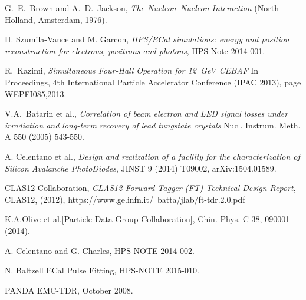 \documentclass[12pt]{report}
\begin{document}
\begin{thebibliography}{99}

  

  G.~E.~Brown and A.~D.~Jackson, {\it The
Nucleon--Nucleon Interaction} (North--Holland, Amsterdam, 1976).

 H. Szumila-Vance and M. Garcon, {\it HPS/ECal simulations: energy and
position reconstruction for electrons, positrons and photons}, HPS-Note 2014-001.

 R.~Kazimi, {\it Simultaneous Four-Hall Operation for 12~GeV CEBAF} In Proceedings, 4th International Particle Accelerator Conference (IPAC 2013), page WEPFI085,2013.

 V.A.~Batarin et al., {\it Correlation of beam electron and LED signal losses under irradiation and long-term recovery of lead tungstate crystals} Nucl. Instrum. Meth. A 550 (2005) 543-550.

 A. Celentano et al., {\it Design and realization of a facility for the characterization of Silicon Avalanche PhotoDiodes}, JINST 9 (2014) T09002, arXiv:1504.01589.

 CLAS12 Collaboration, {\it CLAS12 Forward Tagger (FT) Technical Design Report}, CLAS12, (2012), https://www.ge.infn.it/~batta/jlab/ft-tdr.2.0.pdf

 K.A.Olive et al.[Particle Data Group Collaboration], Chin. Phys. C 38, 090001 (2014).

 A. Celentano and G. Charles, HPS-NOTE 2014-002.

 N. Baltzell ECal Pulse Fitting, HPS-NOTE 2015-010.

 PANDA EMC-TDR, October 2008.


\end{thebibliography}
\end{document}
